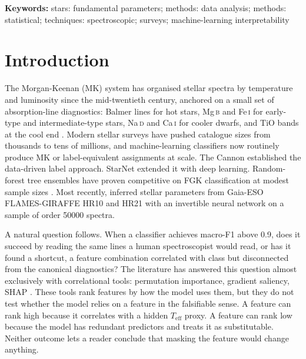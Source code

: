 \documentclass[11pt,a4paper]{article}
\newcommand{\Mgb}{Mg\,\textsc{b}\xspace}
\newcommand{\NaD}{Na\,\textsc{d}\xspace}
\newcommand{\CaI}{Ca\,\textsc{i}\xspace}
\newcommand{\FeI}{Fe\,\textsc{i}\xspace}
\newcommand{\Teff}{$T_{\mathrm{eff}}$\xspace}
\begin{document}
\noindent \textbf{Keywords:} stars: fundamental parameters; methods: data analysis; methods: statistical; techniques: spectroscopic; surveys; machine-learning interpretability

\section{Introduction}
\label{sec:intro}

The Morgan-Keenan (MK) system has organised stellar spectra by temperature and luminosity since the mid-twentieth century, anchored on a small set of absorption-line diagnostics: Balmer lines for hot stars, \Mgb and \FeI for early-type and intermediate-type stars, \NaD and \CaI for cooler dwarfs, and TiO bands at the cool end \citep{GrayCorbally2009}. Modern stellar surveys have pushed catalogue sizes from thousands to tens of millions, and machine-learning classifiers now routinely produce MK or label-equivalent assignments at scale. The Cannon \citep{2015ApJ...808...16N} established the data-driven label approach. StarNet \citep{2018MNRAS.475.2978F} extended it with deep learning. Random-forest tree ensembles have proven competitive on FGK classification at modest sample sizes \citep{2019RAA....19..111L}. Most recently, \citet{2024A&A...692A.228C} inferred stellar parameters from Gaia-ESO FLAMES-GIRAFFE HR10 and HR21 with an invertible neural network on a sample of order 50000 spectra.

A natural question follows. When a classifier achieves macro-F1 above 0.9, does it succeed by reading the same lines a human spectroscopist would read, or has it found a shortcut, a feature combination correlated with class but disconnected from the canonical diagnostics? The literature has answered this question almost exclusively with correlational tools: permutation importance, gradient saliency, SHAP \citep{LundbergLee2017SHAP}. These tools rank features by how the model uses them, but they do not test whether the model relies on a feature in the falsifiable sense. A feature can rank high because it correlates with a hidden \Teff proxy. A feature can rank low because the model has redundant predictors and treats it as substitutable. Neither outcome lets a reader conclude that masking the feature would change anything.
\end{document}

